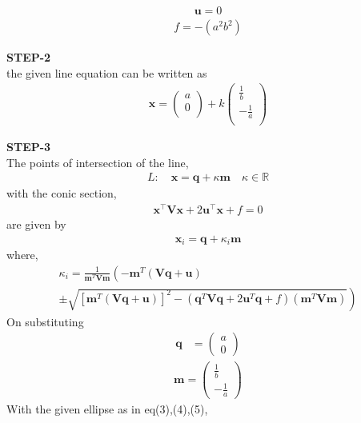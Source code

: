 \documentclass[10pt,a4paper]{report}
\newcommand{\myvec}[1]{\ensuremath{\begin{pmatrix}#1\end{pmatrix}}}
\let\vec\mathbf
\let\vec\mathbf
\providecommand{\brak}[1]{\ensuremath{\left(#1\right)}}
\providecommand{\lbrak}[1]{\ensuremath{\left(#1\right.}}
\providecommand{\rbrak}[1]{\ensuremath{\left.#1\right)}}
\providecommand{\sbrak}[1]{\ensuremath{{}\left[#1\right]}}
\begin{document}
\begin{multicols}{2}
\begin{align}
\vec{u}=0
\end{align} 
\begin{align}
f=-(a^2b^2)
\end{align} \vspace{2mm}


\textbf{STEP-2}\vspace{2mm}\\
the given line equation can be written as\\ 
\begin{align} 
	\vec{x}=\begin{pmatrix}a \\ 0 \\ \end{pmatrix}+k\begin{pmatrix}\frac{1}{b} \\ -\frac{1}{a} \\ \end{pmatrix}
\end{align}

\textbf{STEP-3}\vspace{2mm}\\
The points of intersection of the line, \\ 
\begin{align}
L: \quad \vec{x} = \vec{q} + \kappa \vec{m} \quad \kappa \in \mathbb{R}
\end{align}
with the conic section, \\ 
\begin{align}
	\vec{x}^{\top}\vec{V}\vec{x} + 2\vec{u}^{\top} \vec{x} + f = 0
\end{align}
are given by \\
\begin{align}
\vec{x}_i = \vec{q} + \kappa_i \vec{m}
\end{align}
where, \\
{\tiny
\begin{multline}
\kappa_i = \frac{1}
{
\vec{m}^T\vec{V}\vec{m}
}
\lbrak{-\vec{m}^T\brak{\vec{V}\vec{q}+\vec{u}}}
\\
\pm
\rbrak{\sqrt{
\sbrak{
\vec{m}^T\brak{\vec{V}\vec{q}+\vec{u}}
}^2
-
\brak
{
\vec{q}^T\vec{V}\vec{q} + 2\vec{u}^T\vec{q} +f
}
\brak{\vec{m}^T\vec{V}\vec{m}}
}
}
\end{multline}
}
On substituting\\
\begin{align}
\vec{q} &= \myvec{
a\\
0
} 
\end{align}
\begin{align}
\vec{m} = \myvec{\frac{1}{b} \\ -\frac{1}{a}}
\end{align}
With the given ellipse as in eq(3),(4),(5),\\ 


\end{multicols}
\end{document}
